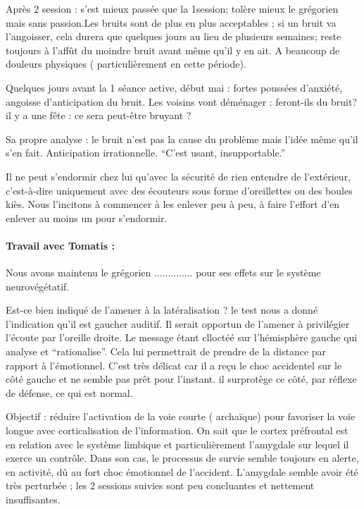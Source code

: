 \documentclass[12pt,french]{report}
\makeatletter
\let\SF@@footnote\footnote
\def\footnote{\ifx\protect\@typeset@protect
    \expandafter\SF@@footnote
  \else
    \expandafter\SF@gobble@opt
  \fi
}
\edef\SF@gobble@opt{\noexpand\protect
  \expandafter\noexpand\csname SF@gobble@opt \endcsname}
\makeatother
\begin{document}
Après 2 \textdegree{} session : s'est mieux passée que la 1\textdegree session;
tolère mieux le grégorien mais sans passion.Les bruits sont de plus
en plus acceptables ; si un bruit va l'angoisser, cela durera que
quelques jours au lieu de plusieurs semaines; reste toujours à l'affût
du moindre bruit avant même qu'il y en ait. A beaucoup de douleurs
physiques ( particulièrement en cette période).

Quelques jours avant la 1\textdegree{} séance active, début mai :
fortes poussées d'anxiété, angoisse d'anticipation du bruit. Les voisins
vont déménager : feront-ils du bruit? il y a une fête : ce sera peut-être
bruyant ?

Sa propre analyse : le bruit n'est pas la cause du problème mais l'idée
même qu'il s'en fait. Anticipation irrationnelle. ``C'est usant,
insupportable.''

Il ne peut s'endormir chez lui qu'avec la sécurité de rien entendre
de l'extérieur, c'est-à-dire uniquement avec des écouteurs sous forme
d'oreillettes ou des boules kiès. Nous l'incitons à commencer à les
enlever peu à peu, à faire l'effort d'en enlever au moins un pour
s'endormir. 

\paragraph{Travail avec Tomatis :}

Nous avons maintenu le grégorien \footnote{..............} pour ses
effets sur le système neurovégétatif.

Est-ce bien indiqué de l'amener à la latéralisation ? le test nous
a donné l'indication qu'il est gaucher auditif. Il serait opportun
de l'amener à privilégier l'écoute par l'oreille droite. Le message
étant clloctéé sur l'hémisphère gauche qui analyse et ``rationalise''.
Cela lui permettrait de prendre de la distance par rapport à l'émotionnel.
C'est très délicat car il a reçu le choc accidentel sur le côté gauche
et ne semble pas prêt pour l'instant. il surprotège ce côté, par réflexe
de défense, ce qui est normal. 

Objectif : réduire l'activation de la voie courte ( archaïque) pour
favoriser la voie longue avec corticalisation de l'information. On
sait que le cortex préfrontal est en relation avec le système limbique
et particulièrement l'amygdale sur lequel il exerce un contrôle. Dans
son cas, le processus de survie semble toujours en alerte, en activité,
dû au fort choc émotionnel de l'accident. L'amygdale semble avoir
été très perturbée ; les 2 sessions suivies sont peu concluantes et
nettement insuffisantes.
\end{document}
